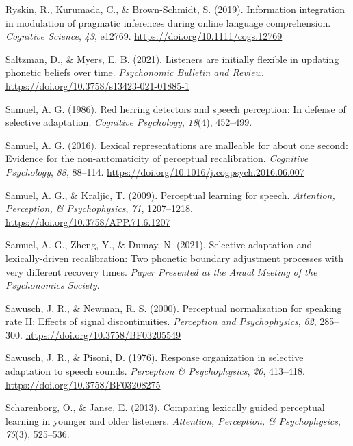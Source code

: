 \documentclass[
  11pt,
  english,
  man,floatsintext]{apa6}
\newlength{\cslhangindent}
\newlength{\cslentryspacingunit} %
\newenvironment{CSLReferences}[2] %
 {%
  \setlength{\parindent}{0pt}
  \ifodd #1
  \let\oldpar\par
  \def\par{\hangindent=\cslhangindent\oldpar}
  \fi
  \setlength{\parskip}{#2\cslentryspacingunit}
 }%
 {}
\begin{document}
\begin{CSLReferences}{1}{0}
\leavevmode{}%
Ryskin, R., Kurumada, C., \& Brown-Schmidt, S. (2019). Information integration in modulation of pragmatic inferences during online language comprehension. \emph{Cognitive Science}, \emph{43}, e12769. \url{https://doi.org/10.1111/cogs.12769}

\leavevmode{}%
Saltzman, D., \& Myers, E. B. (2021). Listeners are initially flexible in updating phonetic beliefs over time. \emph{Psychonomic Bulletin and Review}. \url{https://doi.org/10.3758/s13423-021-01885-1}

\leavevmode{}%
Samuel, A. G. (1986). Red herring detectors and speech perception: In defense of selective adaptation. \emph{Cognitive Psychology}, \emph{18}(4), 452--499.

\leavevmode{}%
Samuel, A. G. (2016). Lexical representations are malleable for about one second: Evidence for the non-automaticity of perceptual recalibration. \emph{Cognitive Psychology}, \emph{88}, 88--114. \url{https://doi.org/10.1016/j.cogpsych.2016.06.007}

\leavevmode{}%
Samuel, A. G., \& Kraljic, T. (2009). Perceptual learning for speech. \emph{Attention, Perception, \& Psychophysics}, \emph{71}, 1207--1218. \url{https://doi.org/10.3758/APP.71.6.1207}

\leavevmode{}%
Samuel, A. G., Zheng, Y., \& Dumay, N. (2021). Selective adaptation and lexically-driven recalibration: Two phonetic boundary adjustment processes with very different recovery times. \emph{Paper Presented at the Anual Meeting of the Psychonomics Society}.

\leavevmode{}%
Sawusch, J. R., \& Newman, R. S. (2000). Perceptual normalization for speaking rate II: Effects of signal discontinuities. \emph{Perception and Psychophysics}, \emph{62}, 285--300. \url{https://doi.org/10.3758/BF03205549}

\leavevmode{}%
Sawusch, J. R., \& Pisoni, D. (1976). Response organization in selective adaptation to speech sounds. \emph{Perception \& Psychophysics}, \emph{20}, 413--418. \url{https://doi.org/10.3758/BF03208275}

\leavevmode{}%
Scharenborg, O., \& Janse, E. (2013). Comparing lexically guided perceptual learning in younger and older listeners. \emph{Attention, Perception, \& Psychophysics}, \emph{75}(3), 525--536.


\end{CSLReferences}
\end{document}
